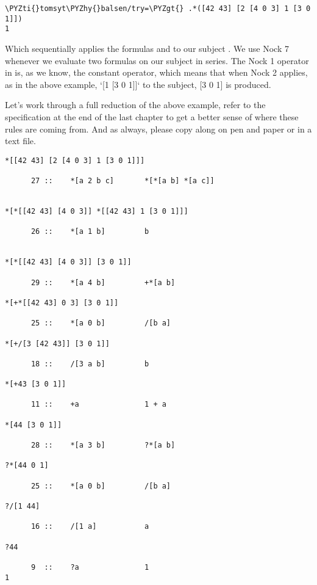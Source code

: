\begin{framed_shaded}
\begin{Verbatim}[fontsize=\relsize{-2.5},commandchars=\\\{\}]
\PYZti{}tomsyt\PYZhy{}balsen/try=\PYZgt{} .*([42 43] [2 [4 0 3] 1 [3 0 1]])
1
\end{Verbatim}
\end{framed_shaded}
Which sequentially applies the formulas \kode{[4 0 3]} and \kode{[3 0 1]} to our subject \kode{[42 43]}. We use Nock 7 whenever we evaluate two formulas on our subject in series. The Nock 1 operator in \kode{*[a 2 b 1 c]} is, as we know, the constant operator, which means that when Nock 2 applies, as in the above example, `[1 [3 0 1]]` to the subject, [3 0 1] is produced.

Let's work through a full reduction of the above example, refer to the specification at the end of the last chapter to get a better sense of where these rules are coming from. And as always, please copy along on pen and paper or in a text file.

\begin{framed_shaded}
\begin{Verbatim}[fontsize=\relsize{-2.5},commandchars=\\\{\}]
*[[42 43] [2 [4 0 3] 1 [3 0 1]]]

      27 ::    *[a 2 b c]       *[*[a b] *[a c]]


*[*[[42 43] [4 0 3]] *[[42 43] 1 [3 0 1]]]

      26 ::    *[a 1 b]         b


*[*[[42 43] [4 0 3]] [3 0 1]]

      29 ::    *[a 4 b]         +*[a b]

*[+*[[42 43] 0 3] [3 0 1]]

      25 ::    *[a 0 b]         /[b a]

*[+/[3 [42 43]] [3 0 1]]

      18 ::    /[3 a b]         b

*[+43 [3 0 1]]

      11 ::    +a               1 + a

*[44 [3 0 1]]

      28 ::    *[a 3 b]         ?*[a b]

?*[44 0 1]

      25 ::    *[a 0 b]         /[b a]

?/[1 44]

      16 ::    /[1 a]           a

?44

      9  ::    ?a               1
1
\end{Verbatim}
\end{framed_shaded}

